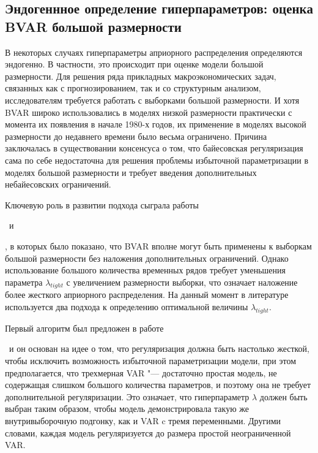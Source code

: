 \documentclass[11pt]{article} %
\newcommand{\eng}[1]{\begin{otherlanguage}{english}#1\end{otherlanguage}}
\begin{document}
\subsection{Эндогеннное определение гиперпараметров: оценка BVAR большой размерности}

В некоторых случаях гиперпараметры априорного распределения определяются эндогенно. В частности, это происходит при оценке модели большой размерности.
Для решения ряда прикладных макроэкономических задач, связанных как с прогнозированием, так и со структурным анализом, исследователям требуется работать с выборками большой размерности.  И хотя BVAR широко использовались в моделях низкой размерности практически с момента их появления в начале 1980-х годов, их применение  в моделях высокой размерности до недавнего времени было весьма ограничено. Причина заключалась в существовании консенсуса о том, что байесовская регуляризация сама по себе недостаточна для решения проблемы избыточной параметризации в моделях большой размерности и требует введения дополнительных небайесовских ограничений.

Ключевую роль в развитии подхода сыграла работы \eng{\cite{demol_al_2008}}~и \eng{\cite{banbura_al_2010}}, в которых было показано, что BVAR вполне могут быть применены к выборкам большой размерности без наложения дополнительных ограничений. Однако использование большого количества временных рядов требует уменьшения параметра $\lambda_{tight}$ с увеличением размерности выборки, что означает наложение более жесткого априорного распределения. На данный момент в литературе используется два подхода к определению оптимальной величины $\lambda_{tight}$.

Первый алгоритм был предложен в работе \eng{\cite{banbura_al_2010}}~и он основан на идее о том, что регуляризация должна быть настолько жесткой, чтобы исключить возможность избыточной параметризации модели, при этом предполагается, что трехмерная VAR "--- достаточно простая  модель, не содержащая слишком большого количества параметров, и поэтому она не требует дополнительной регуляризации. Это означает, что гиперпараметр  $\lambda$ должен быть выбран таким образом, чтобы модель демонстрировала такую же внутривыборочную подгонку, как и VAR c тремя переменными. Другими словами,  каждая модель регуляризуется до размера простой неограниченной VAR.
\end{document}
